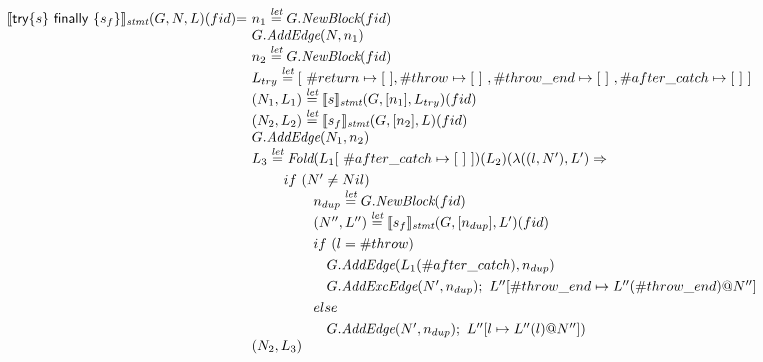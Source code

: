 \[\begin{array}{l@{}l@{~}l}
\transfun{\ircfgtryfin{s}{s_f}}_{\emph{stmt}}(G,N,L)(fid) & = &
	n_1 \letval G.\emph{NewBlock}(fid)\\
	& & G.\emph{AddEdge}(N,n_1)\\
	& & n_2 \letval G.\emph{NewBlock}(fid)\\
	& & L_{try} \letval [\ \#return \mapsto [\ ], \#throw \mapsto [\ ]\ , \#throw\_end \mapsto [\ ]\ , \#after\_catch \mapsto [\ ]\ ] \\
	& & (N_1,L_1) \letval \transfun{s}_{\emph{stmt}}(G,[n_1],L_{try})(fid)\\
	& & (N_2,L_2) \letval \transfun{s_f}_{\emph{stmt}}(G,[n_2],L)(fid)\\ %
	& & G.\emph{AddEdge}(N_1,n_2)\\
	& & L_3 \letval \Fold(L_1[\ \#after\_catch \mapsto [\ ]\ ])(L_2)(\lambda((l,N'),L') \Rightarrow\\
	& & \phantom{L_3 \letval}if\ (N' \neq Nil)\\
	& & \phantom{L_3 \letval \Fold} n_{dup} \letval G.\emph{NewBlock}(fid)\\
	& & \phantom{L_3 \letval \Fold} (N'',L'') \letval \transfun{s_f}_{\emph{stmt}}(G,[n_{dup}],L')(fid)\\
	& & \phantom{L_3 \letval \Fold}if\ (l = \#throw)\\	
	& & \phantom{L_3 \letval \Fold if} G.\emph{AddEdge}(L_1(\#after\_catch),n_{dup})\\
	& & \phantom{L_3 \letval \Fold if} G.\emph{AddExcEdge}(N',n_{dup});\ L''[\#throw\_end \mapsto L''(\#throw\_end)@N'']\\
	& & \phantom{L_3 \letval \Fold}else\\	
	& & \phantom{L_3 \letval \Fold if} G.\emph{AddEdge}(N',n_{dup});\ L''[l \mapsto L''(l)@N''])\\
	& & (N_2,L_3)\\
	& & \\
\end{array}
\]

